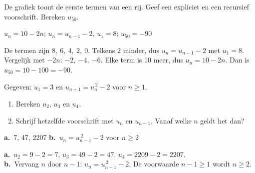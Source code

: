 \begin{oefeningen}
\begin{oefening}[2]\label{oef:h1-grafvs}
\begin{minipage}[t]{.55\linewidth}
De grafiek toont de eerste termen van een rij. Geef een expliciet en een recursief voorschrift. Bereken $u_{50}$.
\end{minipage}\hfill
\begin{minipage}[t]{.38\linewidth}
\vspace{-3mm}
\end{minipage}
\begin{solution}
$u_n=10-2n$; $u_n=u_{n-1}-2$, $u_1=8$; $u_{50}=-90$
\end{solution}
\begin{fullsolution}
De termen zijn $8,\ 6,\ 4,\ 2,\ 0$. Telkens 2 minder, dus $u_n=u_{n-1}-2$ met $u_1=8$. Vergelijk met $-2n$: $-2,\ {-4},\ {-6}$. Elke term is 10 meer, dus $u_n=10-2n$. Dan is $u_{50}=10-100=-90$.
\end{fullsolution}
\end{oefening}

\begin{oefening}[2]
Gegeven: $u_1 = 3$ en $u_{n+1} = u_n^{\,2} - 2$ voor $n \geqslant 1$.
\begin{enumerate}
  \item Bereken $u_2$, $u_3$ en $u_4$.
  \item Schrijf hetzelfde voorschrift met $u_n$ en $u_{n-1}$. Vanaf welke $n$ geldt het dan?
\end{enumerate}
\begin{solution}
\textbf{a.}~7, 47, 2207 \quad \textbf{b.}~$u_n=u_{n-1}^{\,2}-2$ voor $n\geqslant 2$
\end{solution}
\begin{fullsolution}
\textbf{a.}~$u_2=9-2=7$, $u_3=49-2=47$, $u_4=2209-2=2207$.\\
\textbf{b.}~Vervang $n$ door $n-1$: $u_n=u_{n-1}^{\,2}-2$. De voorwaarde $n-1\geqslant 1$ wordt $n\geqslant 2$.
\end{fullsolution}
\end{oefening}


\end{oefeningen}
